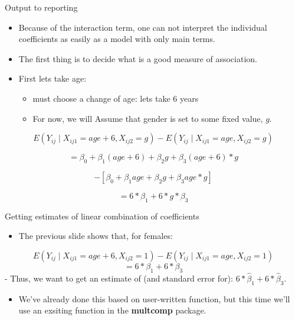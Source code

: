 \documentclass[ignorenonframetext,]{beamer}
\providecommand{\tightlist}{%
  \setlength{\itemsep}{0pt}\setlength{\parskip}{0pt}}
\begin{document}
\begin{frame}{Output to reporting}

\begin{itemize}
\tightlist
\item
  Because of the interaction term, one can not interpret the individual
  coefficients as easily as a model with only main terms.
\item
  The first thing is to decide what is a good measure of association.
\item
  First lets take age:

  \begin{itemize}
  \tightlist
  \item
    must choose a change of age: lets take 6 years
  \item
    For now, we will Assume that gender is set to some fixed value,
    \(g\).
  \end{itemize}
\end{itemize}

\[ E(Y_{ij} \mid X_{ij1}=age+6,X_{ij2}=g) -  E(Y_{ij} \mid X_{ij1}=age,X_{ij2}=g) \]

\[ = \beta_0 +\beta_1 (age+6)+\beta_2 g + \beta_3 (age+6)*g \]

\[ - [\beta_0 +\beta_1 age+\beta_2 g + \beta_3 age*g] \]

\[ = 6*\beta_1 + 6*g*\beta_3\]

\end{frame}

\begin{frame}{Getting estimates of linear combination of coefficients}

\begin{itemize}
\tightlist
\item
  The previous slide shows that, for females:
\end{itemize}

\[ E(Y_{ij} \mid X_{ij1}=age+6,X_{ij2}=1) -  E(Y_{ij} \mid X_{ij1}=age,X_{ij2}=1) \]
\[ =  6*\beta_1 + 6*\beta_3\] - Thus, we want to get an estimate of (and
standard error for): \(6*\hat{\beta}_1 + 6*\hat{\beta}_3\).

\begin{itemize}
\tightlist
\item
  We've already done this based on user-written function, but this time
  we'll use an exsiting function in the \textbf{multcomp} package.
\end{itemize}

\end{frame}
\end{document}
